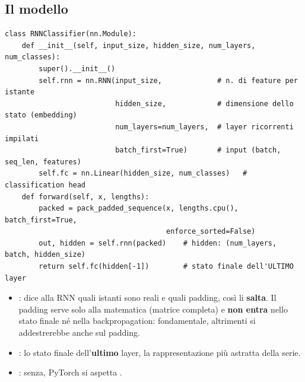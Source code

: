 \subsection{Il modello}
\begin{lstlisting}
class RNNClassifier(nn.Module):
    def __init__(self, input_size, hidden_size, num_layers, num_classes):
        super().__init__()
        self.rnn = nn.RNN(input_size,             # n. di feature per istante
                          hidden_size,            # dimensione dello stato (embedding)
                          num_layers=num_layers,  # layer ricorrenti impilati
                          batch_first=True)       # input (batch, seq_len, features)
        self.fc = nn.Linear(hidden_size, num_classes)   # classification head
    def forward(self, x, lengths):
        packed = pack_padded_sequence(x, lengths.cpu(), batch_first=True,
                                      enforce_sorted=False)
        out, hidden = self.rnn(packed)    # hidden: (num_layers, batch, hidden_size)
        return self.fc(hidden[-1])        # stato finale dell'ULTIMO layer
\end{lstlisting}
\begin{itemize}
  \item {}: dice alla RNN quali istanti sono reali e quali padding, così li \textbf{salta}. Il padding serve
        solo alla matematica (matrice completa) e \textbf{non entra} nello stato finale né nella backpropagation: fondamentale, altrimenti
        si addestrerebbe anche sul padding.
  \item {}: lo stato finale dell'\textbf{ultimo} layer, la rappresentazione più astratta della serie.
  \item {}: senza, PyTorch si aspetta .
\end{itemize}


